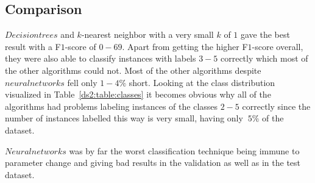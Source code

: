\subsection{Comparison}
$Decision trees$ and $k$-nearest neighbor with a very small $k$ of $1$ gave the best result with a F$1$-score of $0-69$. Apart from getting the higher F$1$-score overall, they were also able to classify instances with labels $3-5$ correctly which most of the other algorithms could not. Most of the other algorithms despite $neural networks$ fell only	$1-4\%$ short.
Looking at the class distribution visualized in Table~\ref{ds2:table:classes} it becomes obvious why all of the algorithms had problems labeling instances of the classes $2-5$ correctly since the number of instances labelled this way is very small, having only $~5\%$ of the dataset.
\par $Neural networks$ was by far the worst classification technique being immune to parameter change and giving bad results in the validation as well as in the test dataset.
\label{ds2:sec:comparison}
